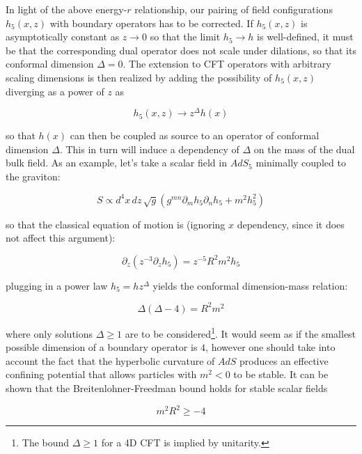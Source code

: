 In light of the above energy-$r$ relationship, our pairing of field configurations $h_5(x,z)$ with boundary operators has to be corrected. If $h_5(x,z)$ is asymptotically constant as $z\rightarrow 0$ so that the limit $h_5 \rightarrow h$ is well-defined, it must be that the corresponding dual operator does not scale under dilations, so that its conformal dimension $\Delta = 0$. The extension to CFT operators with arbitrary scaling dimensions is then realized by adding the possibility of $h_5(x,z)$ diverging as a power of $z$ as

\begin{equation}
	h_5(x,z) \rightarrow z^\Delta h(x)
	\label{}
\end{equation}

so that $h(x)$ can then be coupled as source to an operator of conformal dimension $\Delta$. This in turn will induce a dependency of $\Delta$ on the mass of the dual bulk field. As an example, let's take a scalar field in $AdS_5$ minimally coupled to the graviton:

\begin{equation}
	S \propto d^4 x\, dz \, \sqrt g \left( g^{mn} \partial_m h_5 \partial_n h_5 + m^2 h_5^2 \right)
	\label{}
\end{equation}

so that the classical equation of motion is (ignoring $x$ dependency, since it does not affect this argument):

\begin{equation}
	\partial_z \left( z^{-3} \partial_z h_5 \right) = z^{-5} R^2 m^2 h_5
	\label{ }
\end{equation}

plugging in a power law $h_5 = h z^\Delta$ yields the conformal dimension-mass relation:

\begin{equation}
	\Delta (\Delta-4) = R^2 m^2
	\label{}
\end{equation}

where only solutions $\Delta \geq 1$ are to be considered\footnote{The bound $\Delta \geq 1$ for a 4D CFT is implied by unitarity.}. It would seem as if the smallest possible dimension of a boundary operator is $4$, however one should take into account the fact that the hyperbolic curvature of $AdS$ produces an effective confining potential that allows particles with $m^2 < 0$ to be stable. It can be shown that the Breitenlohner-Freedman bound holds for stable scalar fields

\begin{equation}
	m^2 R^2 \geq - 4
	\label{}
\end{equation}


